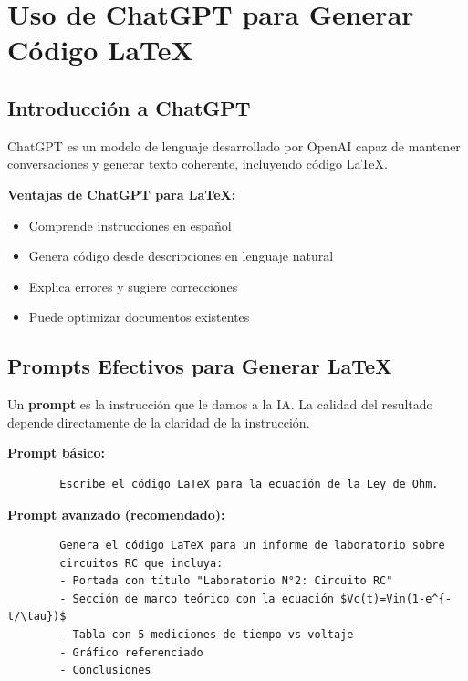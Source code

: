 \documentclass[11pt,letterpaper]{article}
\begin{document}
\newpage


\section{Uso de ChatGPT para Generar Código \LaTeX}

\subsection{Introducción a ChatGPT}

ChatGPT es un modelo de lenguaje desarrollado por OpenAI capaz de mantener conversaciones y generar texto coherente, incluyendo código \LaTeX.

\begin{cajaiaclaro}
	\textbf{Ventajas de ChatGPT para \LaTeX:}
	\begin{itemize}
		\item Comprende instrucciones en español
		\item Genera código desde descripciones en lenguaje natural
		\item Explica errores y sugiere correcciones
		\item Puede optimizar documentos existentes
	\end{itemize}
\end{cajaiaclaro}

\subsection{Prompts Efectivos para Generar \LaTeX}

Un \textbf{prompt} es la instrucción que le damos a la IA. La calidad del resultado depende directamente de la claridad de la instrucción.

\begin{cajaejemplo}
	\textbf{Prompt básico:}
	\begin{verbatim}
		Escribe el código LaTeX para la ecuación de la Ley de Ohm.
	\end{verbatim}
	
	\textbf{Prompt avanzado (recomendado):}
	\begin{verbatim}
		Genera el código LaTeX para un informe de laboratorio sobre 
		circuitos RC que incluya:
		- Portada con título "Laboratorio N°2: Circuito RC"
		- Sección de marco teórico con la ecuación $Vc(t)=Vin(1-e^{-t/\tau})$
		- Tabla con 5 mediciones de tiempo vs voltaje
		- Gráfico referenciado
		- Conclusiones
	\end{verbatim}
\end{cajaejemplo}
\end{document}
